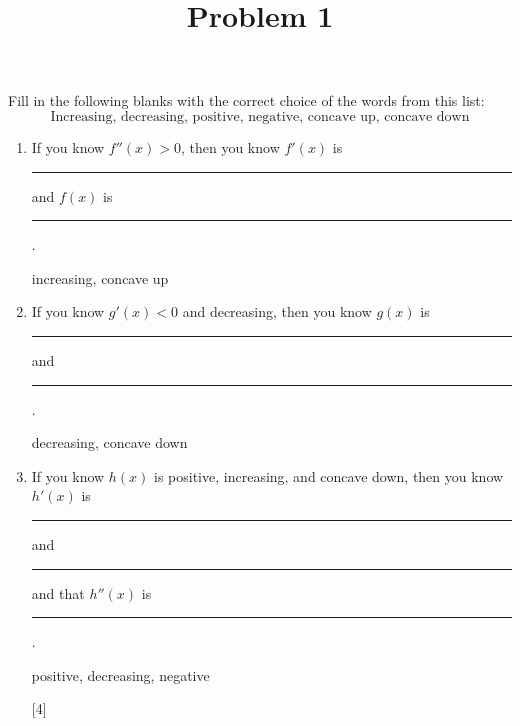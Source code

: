 \documentclass{ximera}
\title[Problem 1]{Problem 1}
\begin{document}
\begin{abstract} \end{abstract}
\maketitle


\begin{problem}
Fill in the following blanks with the correct choice of the words from this list:
$$ \text{Increasing, decreasing, positive, negative, concave up, concave down} $$

	\begin{enumerate}
	
	\item  If you know $f''(x) > 0$, then you know $f'(x)$ is \rule{2in}{0.7mm} and $f(x)$ is \rule{2in}{0.7mm}.
		\begin{explanation}
		increasing, concave up
		\end{explanation}
		
	\item  If you know $g'(x) < 0$ and decreasing, then you know $g(x)$ is \rule{2in}{0.7mm} and \rule{2in}{0.7mm}.
		\begin{explanation}
		decreasing, concave down
		\end{explanation}
		
	\item  If you know $h(x)$ is positive, increasing, and concave down, then you know $h'(x)$ is \rule{2in}{0.7mm} and \rule{2in}{0.7mm} and that $h''(x)$ is \rule{2in}{0.7mm}.
		\begin{explanation}
		positive, decreasing, negative
		\end{explanation}
		
[4]			
			
				
	\end{enumerate}	
		
\end{problem}
\end{document}
